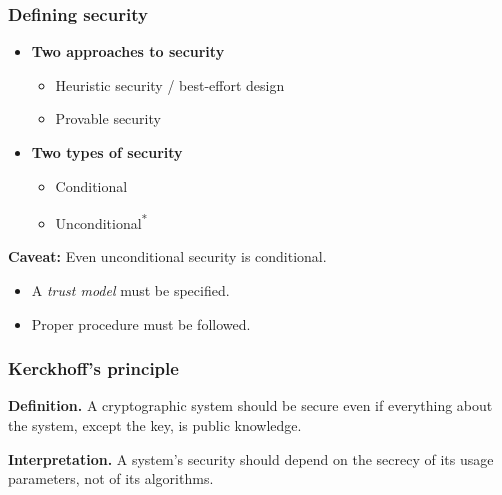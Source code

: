 \begin{frame}
  \frametitle{Defining security}

  \pause
  \begin{itemize}
    \item \textbf{Two approaches to security}
    \begin{itemize}[<+(1)->]
      \item Heuristic security / best-effort design
      \item Provable security
    \end{itemize}

    \vspace*{1em}

    \pause
    \item \textbf{Two types of security}
    \begin{itemize}[<+(1)->]
      \item Conditional
      \item Unconditional\textsuperscript{*}
    \end{itemize}
  \end{itemize}

  \vspace*{1em}

  \pause
  \textbf{Caveat:} Even unconditional security is conditional.
  \pause
  \begin{itemize}
    \item A \emph{trust model} must be specified.
    \pause
    \item Proper procedure must be followed.
  \end{itemize}
\end{frame}

\begin{frame}
  \frametitle{Kerckhoff's principle}

  \pause
  \textbf{Definition.}
  A cryptographic system should be secure even if everything about the system, except the key, is public knowledge.

  \vspace*{1em}

  \pause
  \textbf{Interpretation.}
  A system's security should depend on the secrecy of its usage parameters, not of its algorithms.
\end{frame}

